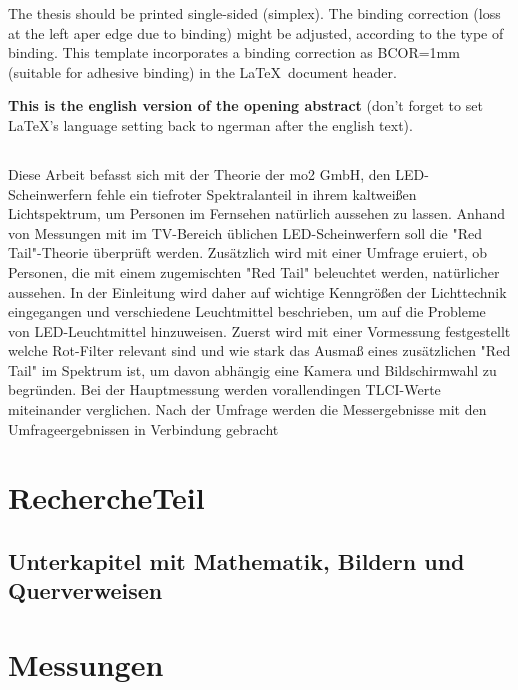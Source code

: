 The thesis should be printed single-sided (simplex). The binding correction (loss at the left aper edge due to binding) might be adjusted, according to the type of binding. This template incorporates a binding correction as BCOR=1mm (suitable for adhesive binding) in the \LaTeX\ document header.

{\bfseries This is the english version of the opening abstract} (don't forget to set \LaTeX's language setting back to ngerman after the english text). 
 
 
\section*{\centering\abstractname}

Diese Arbeit befasst sich mit der Theorie der mo2 GmbH, den LED-Scheinwerfern fehle ein tiefroter Spektralanteil in ihrem kaltweißen Lichtspektrum, um Personen im Fernsehen natürlich aussehen zu lassen. Anhand von Messungen mit im TV-Bereich üblichen LED-Scheinwerfern soll die "Red Tail"-Theorie überprüft werden. Zusätzlich wird mit einer Umfrage eruiert, ob Personen, die mit einem zugemischten "Red Tail" beleuchtet werden, natürlicher aussehen.
In der Einleitung wird daher auf wichtige Kenngrößen der Lichttechnik eingegangen und verschiedene Leuchtmittel beschrieben, um auf die Probleme von LED-Leuchtmittel hinzuweisen. Zuerst wird mit einer Vormessung festgestellt welche Rot-Filter relevant sind und wie stark das Ausmaß eines zusätzlichen "Red Tail" im Spektrum ist, um davon abhängig eine Kamera und Bildschirmwahl zu begründen. Bei der Hauptmessung werden vorallendingen TLCI-Werte miteinander verglichen. Nach der Umfrage werden die Messergebnisse mit den Umfrageergebnissen in Verbindung gebracht 







\chapter{RechercheTeil}

\section{Unterkapitel mit Mathematik, Bildern und Querverweisen}

\chapter{Messungen}

